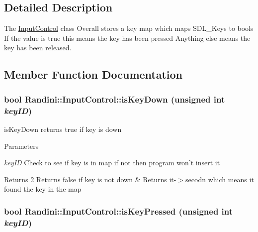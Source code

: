 \subsection{Detailed Description}
The \hyperlink{classRandini_1_1InputControl}{InputControl} class Overall stores a key map which maps SDL\_\-Keys to bools If the value is true this means the key has been pressed Anything else means the key has been released. 

\subsection{Member Function Documentation}
\hypertarget{classRandini_1_1InputControl_a7afd081b388ab767e5f453af0f944af8}{
\subsubsection[{isKeyDown}]{\setlength{\rightskip}{0pt plus 5cm}bool Randini::InputControl::isKeyDown (unsigned int {\em keyID})}}
\label{classRandini_1_1InputControl_a7afd081b388ab767e5f453af0f944af8}


isKeyDown returns true if key is down 
\begin{DoxyParams}{Parameters}
\item[{\em keyID}]Check to see if key is in map if not then program won't insert it \end{DoxyParams}
\begin{DoxyReturn}{Returns}
2 Returns false if key is not down \& Returns it-\/$>$secodn which means it found the key in the map 
\end{DoxyReturn}
\hypertarget{classRandini_1_1InputControl_a1cfe9f5f3d3e551add411776af91ce6f}{
\subsubsection[{isKeyPressed}]{\setlength{\rightskip}{0pt plus 5cm}bool Randini::InputControl::isKeyPressed (unsigned int {\em keyID})}}
\label{classRandini_1_1InputControl_a1cfe9f5f3d3e551add411776af91ce6f}


